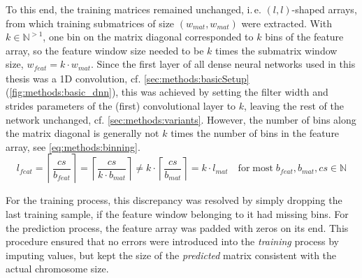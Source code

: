 To this end, the training matrices remained unchanged, i.\,e. $(l, l)$-shaped arrays, from which training submatrices of size  $(w_\mathit{mat}, w_\mathit{mat})$
were extracted. 
With $k \in \mathbb{N}^{>1}$, one bin on the matrix diagonal corresponded to $k$ bins of the feature array,
so the feature window size needed to be $k$ times the submatrix window size, $w_\mathit{feat} = k \cdot w_\mathit{mat}$.
Since the first layer of all dense neural networks used in this thesis was a 1D convolution, cf. \cref{sec:methods:basicSetup}  (\cref{fig:methods:basic_dnn}),
this was achieved by setting the filter width and strides parameters of the (first) convolutional layer to $k$, leaving the rest of the network unchanged,
cf. \cref{sec:methods:variants}.
However, the number of bins along the matrix diagonal is generally not $k$ times the number of bins in the feature array,
see \cref{eq:methods:binning}.
\begin{equation}
 l_\mathit{feat} = \left \lceil{\frac{cs}{b_\mathit{feat}}}\right \rceil
                = \left \lceil{\frac{cs}{k \cdot b_\mathit{mat}}}\right \rceil 
                \not = k \cdot \left \lceil{\frac{cs}{ b_\mathit{mat}}}\right \rceil
                = k \cdot l_\mathit{mat} 
                \mathrm{\quad for\;most\;} b_{feat}, b_{mat}, cs \in \mathbb{N} \label{eq:methods:binning}
\end{equation}

For the training process, this discrepancy was resolved by simply dropping the last training sample, 
if the feature window belonging to it had missing bins.
For the prediction process, the feature array was padded with zeros on its end.
This procedure ensured that no errors were introduced into the \emph{training} process by imputing values,
but kept the size of the \emph{predicted} matrix consistent with the actual chromosome size.

